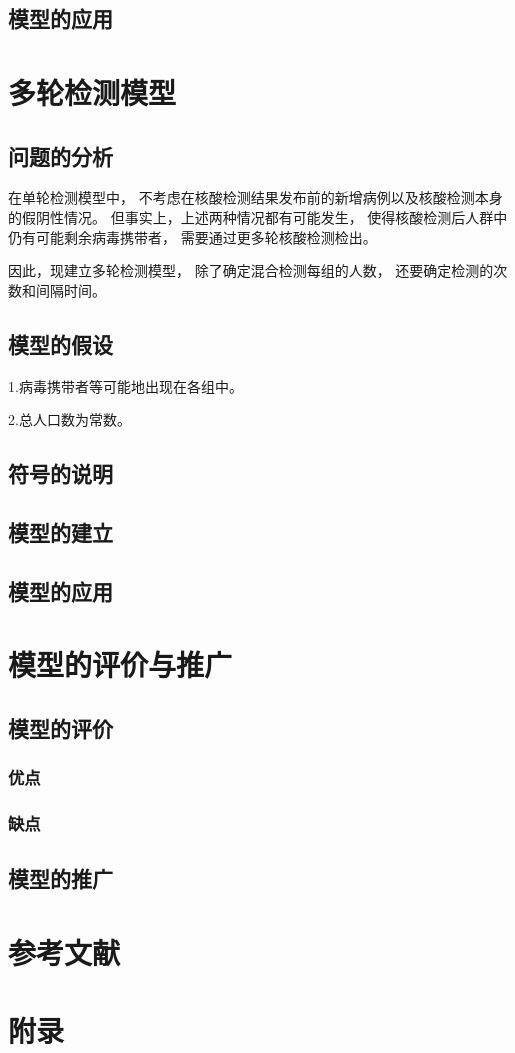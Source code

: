\documentclass[12pt]{article}
\begin{document}
\subsection{模型的应用}

\newpage
{\centering\section{多轮检测模型}}

\subsection{问题的分析}

在单轮检测模型中，
不考虑在核酸检测结果发布前的新增病例以及核酸检测本身的假阴性情况。
但事实上，上述两种情况都有可能发生，
使得核酸检测后人群中仍有可能剩余病毒携带者，
需要通过更多轮核酸检测检出。

因此，现建立多轮检测模型，
除了确定混合检测每组的人数，
还要确定检测的次数和间隔时间。

\subsection{模型的假设}

1.病毒携带者等可能地出现在各组中。

2.总人口数为常数。

\subsection{符号的说明}

\subsection{模型的建立}

\subsection{模型的应用}

{\centering\section{模型的评价与推广}}

\subsection{模型的评价}

\subsubsection{优点}

\subsubsection{缺点}

\subsection{模型的推广}

\newpage
\appendix
{\centering\section*{参考文献}}
{\centering\section*{附录}}
\end{document}
